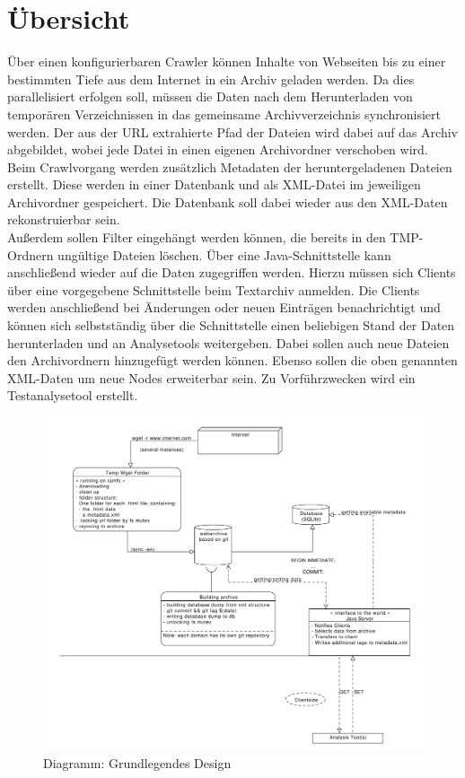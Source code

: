 \chapter{Übersicht}
Über einen konfigurierbaren Crawler können Inhalte von Webseiten bis zu einer bestimmten Tiefe
aus dem Internet in ein Archiv geladen werden. Da dies parallelisiert erfolgen soll,
müssen die Daten nach dem Herunterladen von temporären Verzeichnissen in das gemeinsame
Archivverzeichnis synchronisiert werden. Der aus der URL extrahierte Pfad der Dateien wird
dabei auf das Archiv abgebildet, wobei jede Datei in einen eigenen Archivordner verschoben wird.\\

Beim Crawlvorgang werden zusätzlich Metadaten der heruntergeladenen Dateien erstellt. 
Diese werden in einer Datenbank und als XML-Datei im jeweiligen Archivordner gespeichert.
Die Datenbank soll dabei wieder aus den XML-Daten rekonstruierbar sein. \\ 

Außerdem sollen Filter eingehängt werden können, die bereits in den TMP-Ordnern ungültige Dateien löschen.
Über eine Java-Schnittstelle kann anschließend wieder auf die Daten zugegriffen werden.
Hierzu müssen sich Clients über eine vorgegebene Schnittstelle beim Textarchiv anmelden.
Die Clients werden anschließend bei Änderungen oder neuen Einträgen benachrichtigt und können sich selbstständig über die Schnittstelle einen beliebigen Stand der Daten herunterladen und an Analysetools weitergeben.
Dabei sollen auch neue Dateien den Archivordnern hinzugefügt werden können.
Ebenso sollen die oben genannten XML-Daten um neue Nodes erweiterbar sein.
Zu Vorführzwecken wird ein Testanalysetool erstellt.

\newpage 

\begin{figure}
	\centering
	\label{spec:dia:moduls}
	\includegraphics[width=\textwidth]{spec/webarchiv_design.pdf}
	\caption{Diagramm: Grundlegendes Design}
\end{figure}
 
